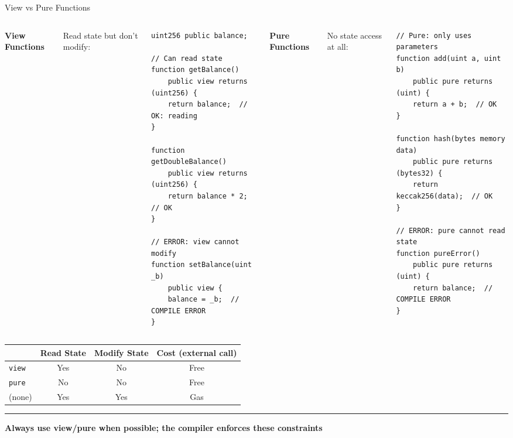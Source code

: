 \documentclass[8pt,aspectratio=169]{beamer}
\newcommand{\bottomnote}[1]{%
\vfill
\vspace{-2mm}
\textcolor{mllavender2}{\rule{\textwidth}{0.4pt}}
\vspace{1mm}
\footnotesize
\textbf{#1}
}
\begin{document}
\begin{frame}[t,fragile]{View vs Pure Functions}
\begin{columns}[T]
\textbf{View Functions}

Read state but don't modify:

\begin{lstlisting}
uint256 public balance;

// Can read state
function getBalance()
    public view returns (uint256) {
    return balance;  // OK: reading
}

function getDoubleBalance()
    public view returns (uint256) {
    return balance * 2;  // OK
}

// ERROR: view cannot modify
function setBalance(uint _b)
    public view {
    balance = _b;  // COMPILE ERROR
}
\end{lstlisting}

\textbf{Pure Functions}

No state access at all:

\begin{lstlisting}
// Pure: only uses parameters
function add(uint a, uint b)
    public pure returns (uint) {
    return a + b;  // OK
}

function hash(bytes memory data)
    public pure returns (bytes32) {
    return keccak256(data);  // OK
}

// ERROR: pure cannot read state
function pureError()
    public pure returns (uint) {
    return balance;  // COMPILE ERROR
}
\end{lstlisting}
\end{columns}

\vspace{0.5em}
\begin{center}
\begin{tabular}{lccc}
\toprule
& \textbf{Read State} & \textbf{Modify State} & \textbf{Cost (external call)} \\
\midrule
\texttt{view} & Yes & No & Free \\
\texttt{pure} & No & No & Free \\
(none) & Yes & Yes & Gas \\
\bottomrule
\end{tabular}
\end{center}

\bottomnote{Always use view/pure when possible; the compiler enforces these constraints}
\end{frame}
\end{document}
